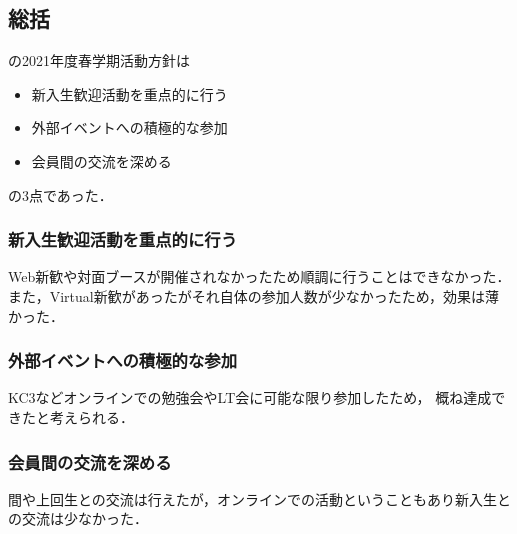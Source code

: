 \subsection*{\secondGrade{}総括}


\secondGrade{}の2021年度春学期活動方針は
\begin{itemize}
    \item 新入生歓迎活動を重点的に行う
    \item 外部イベントへの積極的な参加
    \item 会員間の交流を深める
\end{itemize}
の3点であった．

\subsubsection*{ 新入生歓迎活動を重点的に行う}
Web新歓や対面ブースが開催されなかったため順調に行うことはできなかった．
また，Virtual新歓があったがそれ自体の参加人数が少なかったため，効果は薄かった．

\subsubsection*{外部イベントへの積極的な参加}
KC3などオンラインでの勉強会やLT会に可能な限り参加したため，
概ね達成できたと考えられる．

\subsubsection*{会員間の交流を深める}
\secondGrade{}間や上回生との交流は行えたが，オンラインでの活動ということもあり新入生との交流は少なかった．
